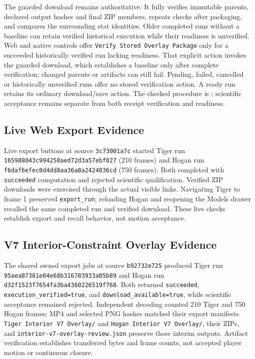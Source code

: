 \documentclass[11pt,letterpaper]{article}
\newcommand{\code}[1]{\nolinkurl{#1}}
\begin{document}
The guarded download remains authoritative. It fully verifies immutable
parents, declared output hashes and final ZIP members, repeats checks after
packaging, and compares the surrounding stat identities. Older completed runs
without a baseline can retain verified historical execution while their
readiness is unverified. Web and native controls offer
\texttt{Verify Stored Overlay Package} only for a succeeded historically
verified run lacking readiness. That explicit action invokes the guarded
download, which establishes a baseline only after complete verification;
changed parents or artifacts can still fail. Pending, failed, cancelled or
historically unverified runs offer no stored verification action. A ready run
retains its ordinary download/save action. The checked procedure is
; scientific acceptance
remains separate from both receipt verification and readiness.

\subsection{Live Web Export Evidence}
Live export buttons at source \code{3c73001a7c} started Tiger run
\code{165988043c994250aed72d3a57ebf027} (210 frames) and Hogan run
\code{f6daf6efec0d4dd8aa36a8a2424036cd} (750 frames). Both completed with
\code{succeeded} computation and rejected scientific qualification. Verified
ZIP downloads were exercised through the actual visible links. Navigating
Tiger to frame 1 preserved \code{export_run}; reloading Hogan and reopening
the Models drawer recalled the same completed run and verified download.
These live checks establish export and recall behavior, not motion acceptance.

\subsection{V7 Interior-Constraint Overlay Evidence}
The shared owned export jobs at source \code{b92732e725} produced Tiger run
\code{95aea87381e04e68b316783933a05b89} and Hogan run
\code{d32f1523f7654fa3ba4360226519f768}. Both returned \code{succeeded},
\code{execution_verified=true}, and \code{download_available=true}, while
scientific acceptance remained rejected. Independent decoding counted 210
Tiger and 750 Hogan frames; MP4 and selected PNG hashes matched their export
manifests. \texttt{Tiger Interior V7 Overlay/} and
\texttt{Hogan Interior V7 Overlay/}, their ZIPs, and
\code{interior-v7-overlay-review.json} preserve these interim outputs.
Artifact verification establishes transferred bytes and frame counts, not
accepted player motion or continuous closure.
\end{document}
